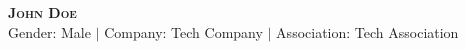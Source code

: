 \documentclass[letterpaper,11pt]{article}
\begin{document}
    \begin{center}
        \textbf{\Huge \scshape John Doe} \\ \vspace{1pt}
        \small Gender: Male $|$ Company: Tech Company $|$ Association: Tech Association
    \end{center}

    
\end{document}
